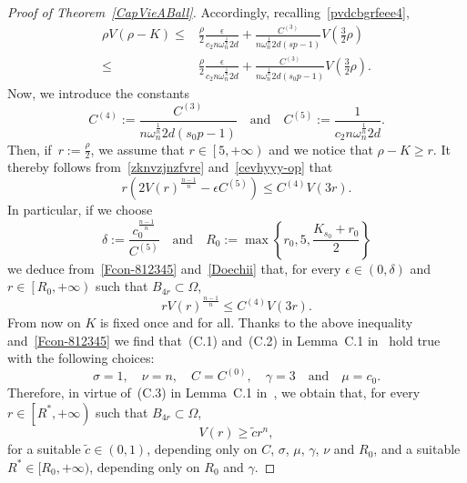 \documentclass[12pt]{article}
\numberwithin{equation}{section}
\renewcommand{\leq}{\leqslant}
\renewcommand{\geq}{\geqslant}
\begin{document}
\begin{proof}[Proof of Theorem~\ref{CapVieABall}]
Accordingly, recalling~\eqref{pvdcbgrfeee4},    
\begin{equation}\label{zknvzjnzfvre}
\begin{split}
\rho V(\rho-K) \leq & \frac{\rho}{2}\frac{\epsilon}{c_2 n\omega_n^{\frac{1}{n}} 2d}     +\frac{C^{(3)}}{n\omega_n^\frac{1}{n} 2d(sp-1)}V\left(\frac{3}{2}\rho\right)\\
\leq & \frac{\rho}{2}\frac{\epsilon}{c_2 n\omega_n^{\frac{1}{n}} 2d}     +\frac{C^{(3)}}{n\omega_n^\frac{1}{n} 2d(s_0 p-1)}V\left(\frac{3}{2}\rho\right).
\end{split}
\end{equation} 
Now, we introduce the constants
\begin{equation}\label{cevhyyy-op}
C^{(4)}:= \frac{C^{(3)}}{n\omega_n^\frac{1}{n} 2d(s_0 p-1)}\quad\mbox{and}\quad C^{(5)}:=\frac{1}{c_2 n\omega_n^{\frac{1}{n}} 2d}.   
\end{equation}
Then, if~$r:=\frac{\rho}{2}$, we assume that $r\in \left[5,+\infty\right)$ and we notice that $\rho-K\geq r$. It thereby follows
from~\eqref{zknvzjnzfvre} and~\eqref{cevhyyy-op} that 
\begin{equation}\label{Doechii}
r\left(2V(r)^{\frac{n-1}{n}}-\epsilon C^{(5)}\right) \leq  C^{(4)} V(3r). 
\end{equation}
In particular, if we choose 
\begin{equation*}
\delta:=\frac{c_0^{\frac{n-1}{n}}}{C^{(5)}}\quad\mbox{and}\quad R_0:=\max\left\lbrace r_0, 5,\frac{K_{s_0}+r_0}{2}\right\rbrace
\end{equation*}
we deduce 
from~\eqref{Fcon-812345} and~\eqref{Doechii} that, for every $\epsilon\in(0,\delta)$ and $r\in \left[R_0,+\infty\right)$ such that $B_{4r}\subset \Omega$,
\begin{equation*}
rV(r)^{\frac{n-1}{n}}\leq C^{(4)}V(3r).  
\end{equation*}
From now on $K$ is fixed once and for all. Thanks to the above inequality and~\eqref{Fcon-812345} we find that~(C.1) and~(C.2) in Lemma~C.1 in~\cite{DFVERPP} hold true with the following choices:
\begin{equation*}
\sigma=1,\quad \nu=n,\quad C=C^{(0)},\quad \gamma=3\quad\mbox{and}\quad \mu=c_0. 
\end{equation*}
Therefore, in virtue of~(C.3) in Lemma~C.1 in~\cite{DFVERPP}, we obtain that, for every $r\in \left[R^*,+\infty\right)$ such that $B_{4r}\subset\Omega$,
\begin{equation}\label{ghbdvfeee}
V(r)\geq \tilde{c}{r^n},
\end{equation}
for a suitable $\tilde{c}\in (0,1)$, depending only on $C$, $\sigma$, $\mu$, $\gamma$, $\nu$ and $R_0$, and a suitable $R^*\in [R_0,+\infty)$, depending only on $R_0$ and $\gamma$.


\end{proof}
\end{document}
